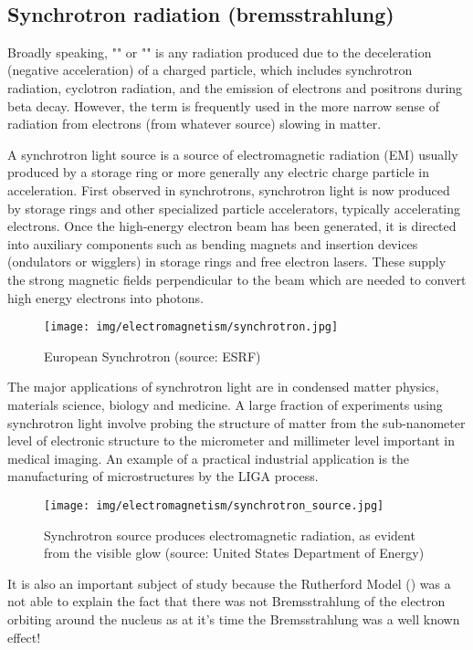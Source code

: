 	\pagebreak
\	\subsection{Synchrotron radiation (bremsstrahlung)}\label{bremsstrahlung}
	Broadly speaking, "" or "" is any radiation produced due to the deceleration (negative acceleration) of a charged particle, which includes synchrotron radiation, cyclotron radiation, and the emission of electrons and positrons during beta decay. However, the term is frequently used in the more narrow sense of radiation from electrons (from whatever source) slowing in matter.
	
	A synchrotron light source is a source of electromagnetic radiation (EM) usually produced by a storage ring or more generally any electric charge particle in acceleration. First observed in synchrotrons, synchrotron light is now produced by storage rings and other specialized particle accelerators, typically accelerating electrons. Once the high-energy electron beam has been generated, it is directed into auxiliary components such as bending magnets and insertion devices (ondulators or wigglers) in storage rings and free electron lasers. These supply the strong magnetic fields perpendicular to the beam which are needed to convert high energy electrons into photons.
	\begin{figure}[H]
		\centering
		\texttt{[image: img/electromagnetism/synchrotron.jpg]}
		\caption[European Synchrotron]{European Synchrotron (source: ESRF)}
	\end{figure}
	The major applications of synchrotron light are in condensed matter physics, materials science, biology and medicine. A large fraction of experiments using synchrotron light involve probing the structure of matter from the sub-nanometer level of electronic structure to the micrometer and millimeter level important in medical imaging. An example of a practical industrial application is the manufacturing of microstructures by the LIGA process.
	\begin{figure}[H]
		\centering
		\texttt{[image: img/electromagnetism/synchrotron\_source.jpg]}
		\caption[Synchrotron source produces electromagnetic radiation]{Synchrotron source produces electromagnetic radiation, as evident from the visible glow (source: United States Department of Energy)}
	\end{figure}
	It is also an important subject of study because the Rutherford  Model () was a not able to explain the fact that there was not Bremsstrahlung of the electron orbiting around the nucleus as at it's time the Bremsstrahlung was a well known effect!
	
